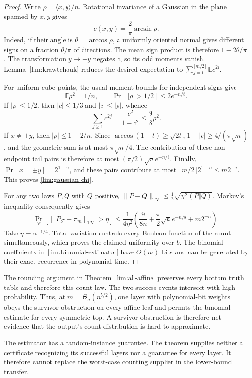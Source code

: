 \documentclass[11pt,letterpaper]{article}
\theoremstyle{definition}
\theoremstyle{remark}
\begin{document}
\begin{proof}
Write $\rho=\langle x,y\rangle/n$.  Rotational invariance of a Gaussian
in the plane spanned by $x,y$ gives
\[
 c(x,y)=\frac2\pi\arcsin\rho.
\]
Indeed, if their angle is $\theta=\arccos\rho$, a uniformly oriented
normal gives different signs on a fraction $\theta/\pi$ of directions.
The mean sign product is therefore $1-2\theta/\pi$.
The transformation $y\mapsto-y$ negates $c$, so its odd moments vanish.
Lemma~\ref{lim:krawtchouk} reduces the desired expectation to
$\sum_{j=1}^{\lfloor m/2\rfloor}\mathbb E c^{2j}$.

For uniform cube points, the usual moment bounds for independent signs give
\[
 \mathbb E\rho^2=1/n,
 \qquad \Pr[|\rho|>1/2]\le2e^{-n/8}.
\]
If $|\rho|\le1/2$, then $|c|\le1/3$ and
$|c|\le|\rho|$, whence
\[
 \sum_{j\ge1}c^{2j}=\frac{c^2}{1-c^2}\le\frac98\rho^2.
\]
If $x\ne\pm y$, then $|\rho|\le1-2/n$.  Since
$\arccos(1-t)\ge\sqrt{2t}$,
$1-|c|\ge4/(\pi\sqrt n)$, and the geometric sum is at most
$\pi\sqrt n/4$.  The contribution of these non-endpoint tail pairs is
therefore at most $(\pi/2)\sqrt n e^{-n/8}$.
Finally, $\Pr[x=\pm y]=2^{1-n}$, and these pairs contribute at most
$\lfloor m/2\rfloor2^{1-n}\le m2^{-n}$.  This proves
\eqref{lim:gaussian-chi}.

For any two laws $P,Q$ with $Q$ positive,
$\|P-Q\|_{\mathrm{TV}}\le\frac12\sqrt{\chi^2(P\Vert Q)}$.
Markov's inequality consequently gives
\[
 \Pr_{\mathcal F}[\|P_{\mathcal F}-\pi_m\|_{\mathrm{TV}}>\eta]
 \le \frac1{4\eta^2}
 \left(\frac9{8n}+\frac\pi2\sqrt n e^{-n/8}+m2^{-n}\right).
\]
Take $\eta=n^{-1/4}$.  Total variation controls every Boolean function of
the count simultaneously, which proves the claimed uniformity over $b$.
The binomial coefficients in~\eqref{lim:binomial-estimator} have $O(m)$
bits and can be generated by their exact recurrence in polynomial time.
\end{proof}

The rounding argument in Theorem~\ref{lim:all-affine} preserves every
bottom truth table and therefore this count law.  The two success events
intersect with high probability.  Thus, at $m=\Theta_a(n^{5/2})$, one layer
with polynomial-bit weights obeys the survivor obstruction on every
affine leaf and permits the binomial estimate for every symmetric top.
A survivor obstruction is therefore not evidence that the output's count
distribution is hard to approximate.

The estimator has a random-instance guarantee.  The theorem supplies
neither a certificate recognizing its successful layers nor a guarantee
for every layer.  It therefore cannot replace the worst-case counting
supplier in the lower-bound transfer.
\end{document}
